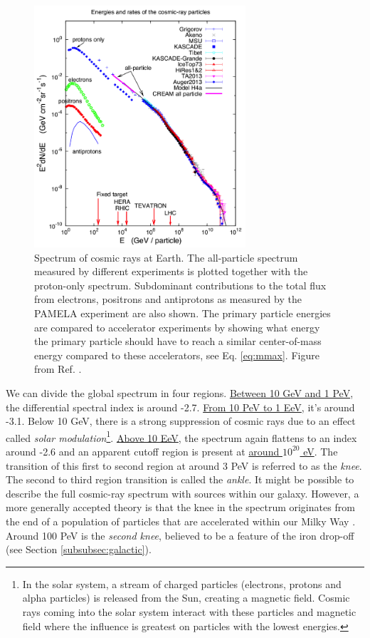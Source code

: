 \begin{figure}
\centering
\includegraphics[width = 0.7\textwidth]{chapter3/img/spectrumCR.png}
\caption{Spectrum of cosmic rays at Earth. The all-particle spectrum measured by different experiments is plotted together with the proton-only spectrum. Subdominant contributions to the total flux from electrons, positrons and antiprotons as measured by the PAMELA experiment are also shown. The primary particle energies are compared to accelerator experiments by showing what energy the primary particle should have to reach a similar center-of-mass energy compared to these accelerators, see Eq. \ref{eq:mmax}. Figure from Ref. \cite{Blasi:2013rva}.}
\label{fig:spectrumCR}
\end{figure}

We can divide the global spectrum in four regions. \underline{Between 10 GeV and 1 PeV}, the differential spectral index is around -2.7. \underline{From 10 PeV to 1 EeV}, it's around -3.1. Below 10 GeV, there is a strong suppression of cosmic rays due to an effect called \textit{solar modulation}\footnote{In the solar system, a stream of charged particles (electrons, protons and alpha particles) is released from the Sun, creating a magnetic field. Cosmic rays coming into the solar system interact with these particles and magnetic field where the influence is greatest on particles with the lowest energies.}. \underline{Above 10 EeV}, the spectrum again flattens to an index around -2.6 and an apparent cutoff region is present at  \underline{around $10^{20}$ eV}. The transition of this first to second region at around 3 PeV is referred to as the \textit{knee}. The second to third region transition is called the \textit{ankle}. It might be possible to describe the full cosmic-ray spectrum with sources within our galaxy. However, a more generally accepted theory is that the knee in the spectrum originates from the end of a population of particles that are accelerated within our Milky Way \cite{Gaisser:2013bla}. Around 100 PeV is the \textit{second knee}, believed to be a feature of the iron drop-off (see Section \ref{subsubsec:galactic}).

